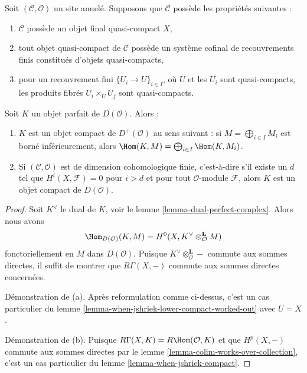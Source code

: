 \begin{lemma}
\label{lemma-perfect-is-compact}
Soit $(\mathcal{C}, \mathcal{O})$ un site annelé. Supposons que
$\mathcal{C}$ possède les propriétés suivantes :
\begin{enumerate}
\item $\mathcal{C}$ possède un objet final quasi-compact $X$,
\item tout objet quasi-compact de $\mathcal{C}$ possède un système cofinal de
recouvrements finis constitués d'objets quasi-compacts,
\item pour un recouvrement fini $\{U_i \to U\}_{i \in I}$, où $U$ et les
$U_i$ sont quasi-compacts, les produits fibrés $U_i \times_U U_j$ sont
quasi-compacts.
\end{enumerate}
Soit $K$ un objet parfait de $D(\mathcal{O})$. Alors :
\begin{enumerate}
\item[(a)] $K$ est un objet compact de $D^+(\mathcal{O})$ au sens suivant :
si $M = \bigoplus_{i \in I} M_i$ est borné inférieurement, alors
$\Hom(K, M) = \bigoplus_{i \in I} \Hom(K, M_i)$.
\item[(b)] Si $(\mathcal{C}, \mathcal{O})$ est de dimension cohomologique
finie, c'est-à-dire s'il existe un $d$ tel que
$H^i(X, \mathcal{F}) = 0$ pour $i > d$ et pour tout $\mathcal{O}$-module
$\mathcal{F}$, alors $K$ est un objet compact de $D(\mathcal{O})$.
\end{enumerate}
\end{lemma}

\begin{proof}
Soit $K^\vee$ le dual de $K$, voir le lemme
\ref{lemma-dual-perfect-complex}. Alors nous avons
$$
\Hom_{D(\mathcal{O})}(K, M) =
H^0(X, K^\vee \otimes_\mathcal{O}^\mathbf{L} M)
$$
fonctoriellement en $M$ dans $D(\mathcal{O})$. Puisque
$K^\vee \otimes_\mathcal{O}^\mathbf{L} -$ commute aux sommes directes, il
suffit de montrer que $R\Gamma(X, -)$ commute aux sommes directes concernées.

\medskip\noindent
Démonstration de (a). Après reformulation comme ci-dessus, c'est un cas
particulier du lemme \ref{lemma-when-jshriek-lower-compact-worked-out} avec
$U = X$.

\medskip\noindent
Démonstration de (b). Puisque $R\Gamma(X, K) = R\Hom(\mathcal{O}, K)$ et que
$H^p(X, -)$ commute aux sommes directes par le lemme
\ref{lemma-colim-works-over-collection}, c'est un cas particulier du lemme
\ref{lemma-when-jshriek-compact}.
\end{proof}






